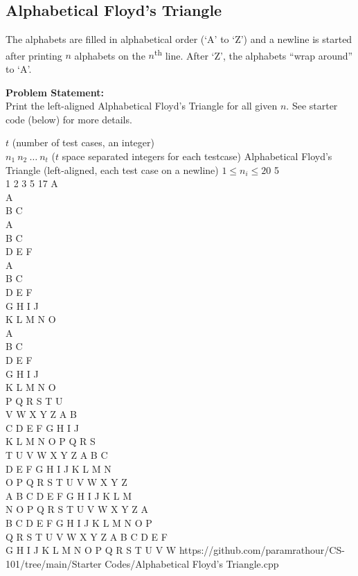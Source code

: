 \documentclass[../../Problems]{subfiles}
\begin{document}
\subsection{Alphabetical Floyd's Triangle}{\label{pp:alphabeticalfloydstriangle}}
The alphabets are filled in alphabetical order (`A' to `Z') and a newline is started after printing $n$ alphabets on the $n$\textsuperscript{th} line. After `Z', the alphabets ``wrap around'' to `A'.

\textbf{Problem Statement:}\\
Print the left-aligned Alphabetical Floyd's Triangle for all given $n$. See starter code (below) for more details.
\begin{testcases}
	{$t$ \hfill(number of test cases, an integer)\\$n_1\ n_2\ \ldots\ n_t$ \hfill($t$ space separated integers for each testcase)}
	{Alphabetical Floyd's Triangle \hfill(left-aligned, each test case on a newline)}
	{$1 \leq n_i \leq 20$}
	{5\\1 2 3 5 17}
	{A\\[1em]A\\B C\\[1em]A\\B C\\D E F\\[1em]A\\B C\\D E F\\G H I J\\K L M N O\\[1em]A\\B C\\D E F\\G H I J\\K L M N O\\P Q R S T U\\V W X Y Z A B\\C D E F G H I J\\K L M N O P Q R S\\T U V W X Y Z A B C\\D E F G H I J K L M N\\O P Q R S T U V W X Y Z\\A B C D E F G H I J K L M\\N O P Q R S T U V W X Y Z A\\B C D E F G H I J K L M N O P\\Q R S T U V W X Y Z A B C D E F\\G H I J K L M N O P Q R S T U V W}
	{https://github.com/paramrathour/CS-101/tree/main/Starter Codes/Alphabetical Floyd's Triangle.cpp}
\end{testcases}
\end{document}
